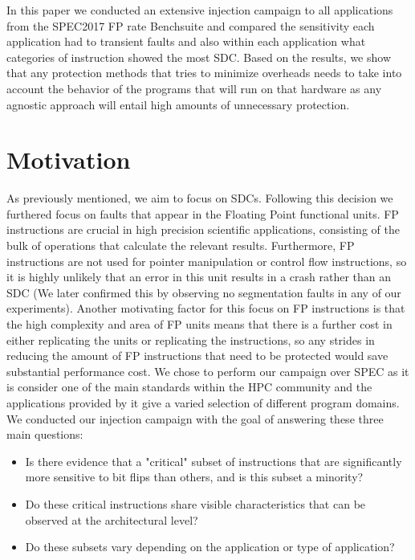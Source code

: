 \documentclass[lettersize,journal]{IEEEtran}
\begin{document}
In this paper we conducted an extensive injection campaign to all applications from the SPEC2017 FP rate Benchsuite and compared the sensitivity each application had to transient faults and also within each application what categories of instruction showed the most SDC. Based on the results, we show that any protection methods that tries to minimize overheads needs to take into account the behavior of the programs that will run on that hardware as any agnostic approach will entail high amounts of unnecessary protection.


\section{Motivation}
As previously mentioned, we aim to focus on SDCs. Following this decision we furthered focus on faults that appear in the Floating Point functional units. 
FP instructions are crucial in high precision scientific applications, consisting of the bulk of operations that calculate the relevant results. Furthermore, FP instructions are not used for pointer manipulation or control flow instructions, so it is highly unlikely that an error in this unit results in a crash rather than an SDC (We later confirmed this by observing no segmentation faults in any of our experiments).
Another motivating factor for this focus on FP instructions is that the high complexity and area of FP units means that there is a further cost in either replicating the units or replicating the instructions, so any strides in reducing the amount of FP instructions that need to be protected would save substantial performance cost.
We chose to perform our campaign over SPEC as it is consider one of the main standards within the HPC community and the applications provided by it give a varied selection of different program domains.\\
We conducted our injection campaign with the goal of answering these three main questions:
\begin{itemize}
    \item Is there evidence that a "critical" subset of instructions that are significantly more sensitive to bit flips than others, and is this subset a minority?
    \item Do these critical instructions share visible characteristics that can be observed at the architectural level?
    \item Do these subsets vary depending on the application or type of application?
\end{itemize}
\end{document}
